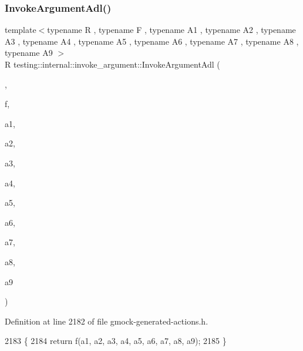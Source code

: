 \subsubsection{\texorpdfstring{Invoke\+Argument\+Adl()}{InvokeArgumentAdl()}\hspace{0.1cm}{\footnotesize\ttfamily [10/11]}}
{\footnotesize\ttfamily template$<$typename R , typename F , typename A1 , typename A2 , typename A3 , typename A4 , typename A5 , typename A6 , typename A7 , typename A8 , typename A9 $>$ \\
R testing\+::internal\+::invoke\+\_\+argument\+::\+Invoke\+Argument\+Adl (\begin{DoxyParamCaption}\item[{\hyperlink{structtesting_1_1internal_1_1invoke__argument_1_1AdlTag}{Adl\+Tag}}]{,  }\item[{F}]{f,  }\item[{A1}]{a1,  }\item[{A2}]{a2,  }\item[{A3}]{a3,  }\item[{A4}]{a4,  }\item[{A5}]{a5,  }\item[{A6}]{a6,  }\item[{A7}]{a7,  }\item[{A8}]{a8,  }\item[{A9}]{a9 }\end{DoxyParamCaption})}



Definition at line 2182 of file gmock-\/generated-\/actions.\+h.


\begin{DoxyCode}
2183                          \{
2184   \textcolor{keywordflow}{return} f(a1, a2, a3, a4, a5, a6, a7, a8, a9);
2185 \}
\end{DoxyCode}
\mbox{\label{namespacetesting_1_1internal_1_1invoke__argument_abd36164191a3e386c50243074854b272}} 
